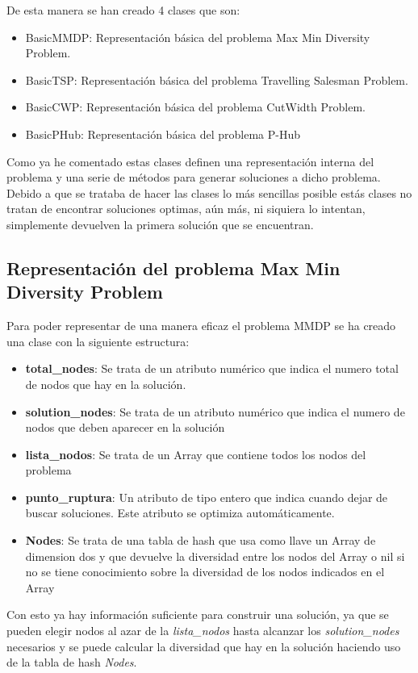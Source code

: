 \documentclass[12pt,a4paper,draft,openany]{article}
\begin{document}
De esta manera se han creado 4 clases que son:
\begin{itemize}
\item BasicMMDP: Representación básica del problema Max Min Diversity Problem.
\item BasicTSP: Representación básica del problema Travelling Salesman Problem.
\item BasicCWP: Representación básica del problema CutWidth Problem.
\item BasicPHub: Representación básica del problema P-Hub
\end{itemize}

Como ya he comentado estas clases definen una representación interna del problema y una serie de métodos para generar soluciones a dicho problema. Debido a que se trataba de hacer las
clases lo más sencillas posible estás clases no tratan de encontrar soluciones optimas, aún más, ni siquiera lo intentan, simplemente devuelven la primera solución que se encuentran.

\subsection{Representación del problema Max Min Diversity Problem}
Para poder representar de una manera eficaz el problema MMDP se ha creado una clase con
la siguiente estructura:

\begin{itemize}
\item \textbf{total\_nodes}: Se trata de un atributo numérico que indica el numero total de nodos que hay en la solución.
\item \textbf{solution\_nodes}: Se trata de un atributo numérico que indica el numero de nodos que deben aparecer en la solución
\item \textbf{lista\_nodos}: Se trata de un Array que contiene todos los nodos del problema
\item \textbf{punto\_ruptura}: Un atributo de tipo entero que indica cuando dejar de buscar soluciones. Este atributo se optimiza automáticamente.
\item \textbf{Nodes}: Se trata de una tabla de hash que usa como llave un Array de dimension dos y que devuelve la diversidad entre los nodos del Array o nil si no se tiene conocimiento sobre la diversidad de los nodos indicados en el Array
\end{itemize}

Con esto ya hay información suficiente para construir una solución, ya que se pueden elegir nodos al azar de la \emph{lista\_nodos} hasta alcanzar los \emph{solution\_nodes} necesarios y se puede calcular la diversidad que hay en la solución haciendo uso de la tabla de hash \emph{Nodes}.
\end{document}
